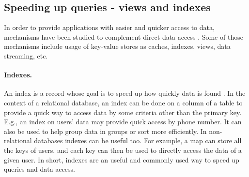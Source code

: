 



\subsection{Speeding up queries - views and indexes}
\label{subsec:views}

In order to provide applications with easier and quicker access to data, mechanisms have been studied to complement direct data access \cite{noria, dbtoaster, pequod, txcache, viewSelection, optIncMaintenance, effMaintenance, lazyMaintenance, genIndex, partIndex, dbproxy}. 
Some of those mechanisms include usage of key-value stores as caches, indexes, views, data streaming, etc.

\paragraph{Indexes.}
An index is a record whose goal is to speed up how quickly data is found \cite{partIndex, genIndex, mongoVScassandra}. %
In the context of a relational database, an index can be done on a column of a table to provide a quick way to access data by some criteria other than the primary key.
E.g., an index on users' data may provide quick access by phone number.
It can also be used to help group data in groups or sort more efficiently.
In non-relational databases indexes can be useful too. For example, a map can store all the keys of users, and each key can then be used to directly access the data of a given user.
In short, indexes are an useful and commonly used way to speed up queries and data access.

